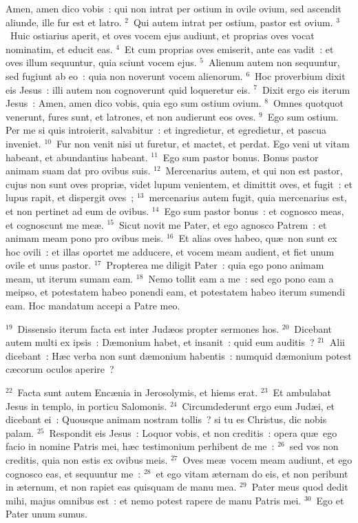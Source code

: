 \lettrine[lines=10,image=true,loversize=0.05,lraise=-0.03]{A}{}men, amen dico vobis~: qui non intrat per ostium in ovile ovium, sed ascendit aliunde, ille fur est et latro.
${}^{2}$~Qui autem intrat per ostium, pastor est ovium.
${}^{3}$~Huic ostiarius aperit, et oves vocem ejus audiunt, et proprias oves vocat nominatim, et educit eas.
${}^{4}$~Et cum proprias oves emiserit, ante eas vadit~: et oves illum sequuntur, quia sciunt vocem ejus.
${}^{5}$~Alienum autem non sequuntur, sed fugiunt ab eo~: quia non noverunt vocem alienorum.
${}^{6}$~Hoc proverbium dixit eis Jesus~: illi autem non cognoverunt quid loqueretur eis.
${}^{7}$~Dixit ergo eis iterum Jesus~: Amen, amen dico vobis, quia ego sum ostium ovium.
${}^{8}$~Omnes quotquot venerunt, fures sunt, et latrones, et non audierunt eos oves.
${}^{9}$~Ego sum ostium. Per me si quis introierit, salvabitur~: et ingredietur, et egredietur, et pascua inveniet.
${}^{10}$~Fur non venit nisi ut furetur, et mactet, et perdat. Ego veni ut vitam habeant, et abundantius habeant.
${}^{11}$~Ego sum pastor bonus. Bonus pastor animam suam dat pro ovibus suis.
${}^{12}$~Mercenarius autem, et qui non est pastor, cujus non sunt oves propri\ae , videt lupum venientem, et dimittit oves, et fugit~: et lupus rapit, et dispergit oves~;
${}^{13}$~mercenarius autem fugit, quia mercenarius est, et non pertinet ad eum de ovibus.
${}^{14}$~Ego sum pastor bonus~: et cognosco meas, et cognoscunt me me\ae .
${}^{15}$~Sicut novit me Pater, et ego agnosco Patrem~: et animam meam pono pro ovibus meis.
${}^{16}$~Et alias oves habeo, qu\ae\ non sunt ex hoc ovili~: et illas oportet me adducere, et vocem meam audient, et fiet unum ovile et unus pastor.
${}^{17}$~Propterea me diligit Pater~: quia ego pono animam meam, ut iterum sumam eam.
${}^{18}$~Nemo tollit eam a me~: sed ego pono eam a meipso, et potestatem habeo ponendi eam, et potestatem habeo iterum sumendi eam. Hoc mandatum accepi a Patre meo.


${}^{19}$~Dissensio iterum facta est inter Jud\ae os propter sermones hos.
${}^{20}$~Dicebant autem multi ex ipsis~: D\ae monium habet, et insanit~: quid eum auditis~?
${}^{21}$~Alii dicebant~: H\ae c verba non sunt d\ae monium habentis~: numquid d\ae monium potest c\ae corum oculos aperire~?


${}^{22}$~Facta sunt autem Enc\ae nia in Jerosolymis, et hiems erat.
${}^{23}$~Et ambulabat Jesus in templo, in porticu Salomonis.
${}^{24}$~Circumdederunt ergo eum Jud\ae i, et dicebant ei~: Quousque animam nostram tollis~? si tu es Christus, dic nobis palam.
${}^{25}$~Respondit eis Jesus~: Loquor vobis, et non creditis~: opera qu\ae\ ego facio in nomine Patris mei, h\ae c testimonium perhibent de me~:
${}^{26}$~sed vos non creditis, quia non estis ex ovibus meis.
${}^{27}$~Oves me\ae\ vocem meam audiunt, et ego cognosco eas, et sequuntur me~:
${}^{28}$~et ego vitam \ae ternam do eis, et non peribunt in \ae ternum, et non rapiet eas quisquam de manu mea.
${}^{29}$~Pater meus quod dedit mihi, majus omnibus est~: et nemo potest rapere de manu Patris mei.
${}^{30}$~Ego et Pater unum sumus.



